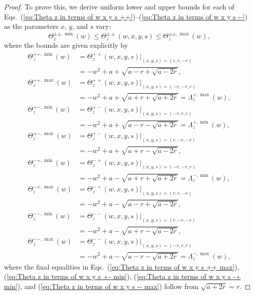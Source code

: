 \documentclass[12pt]{iopart}
\begin{document}
\begin{proof}
To prove this, we derive uniform lower and upper bounds for each of Eqs.~(\ref{eq:Theta z in terms of w x y s ++})–(\ref{eq:Theta z in terms of w x y s --}) as the parameters \( x \), \( y \), and \( s \) vary:  
\begin{equation}\label{eq:Thetas pm uniform bounds}
\Theta^{\pm\pm,\min}_z(w) \leq \Theta^{\pm\pm}_z(w,x,y,s) \leq \Theta^{\pm\pm,\max}_z(w),
\end{equation} 
where the bounds are given explicitly by  
\begin{eqnarray}
\Theta^{++,\min}_z(w) &= \Theta^{++}_z(w,x,y,s)|_{(x,y,s)=(r,r,-r)} \nonumber \\
&= -w^2 + a + \sqrt{a-r + \sqrt{a-2r}}, \label{eq:Theta z in terms of w x y s ++ min} \\
\Theta^{++,\max}_z(w) &= \Theta^{++}_z(w,x,y,s)|_{(x,y,s)=(-r,-r,r)} \nonumber \\
&= -w^2 + a + \sqrt{a+r + \sqrt{a+2r}} = \Lambda^{+,\max}_z(w), \label{eq:Theta z in terms of w x y s ++ max} \\
\Theta^{+-,\min}_z(w) &= \Theta^{+-}_z(w,x,y,s)|_{(x,y,s)=(-r,r,r)} \nonumber \\
&= -w^2 + a + \sqrt{a-r - \sqrt{a+2r}} = \Lambda^{+,\min}_z(w), \label{eq:Theta z in terms of w x y s +- min} \\
\Theta^{+-,\max}_z(w) &= \Theta^{+-}_z(w,x,y,s)|_{(x,y,s)=(r,-r,-r)} \nonumber \\
&= -w^2 + a + \sqrt{a+r - \sqrt{a-2r}}, \label{eq:Theta z in terms of w x y s +- max} \\
\Theta^{-+,\min}_z(w) &= \Theta^{-+}_z(w,x,y,s)|_{(x,y,s)=(-r,-r,r)} \nonumber \\
&= -w^2 + a - \sqrt{a+r + \sqrt{a+2r}} = \Lambda^{-,\min}_z(w), \label{eq:Theta z in terms of w x y s -+ min} \\
\Theta^{-+,\max}_z(w) &= \Theta^{-+}_z(w,x,y,s)|_{(x,y,s)=(r,r,-r)} \nonumber \\
&= -w^2 + a - \sqrt{a-r + \sqrt{a-2r}}, \label{eq:Theta z in terms of w x y s -+ max} \\
\Theta^{--,\min}_z(w) &= \Theta^{--}_z(w,x,y,s)|_{(x,y,s)=(r,-r,-r)} \nonumber \\
&= -w^2 + a - \sqrt{a+r - \sqrt{a-2r}}, \label{eq:Theta z in terms of w x y s -- min} \\
\Theta^{--,\max}_z(w) &= \Theta^{--}_z(w,x,y,s)|_{(x,y,s)=(-r,r,r)} \nonumber \\
&= -w^2 + a - \sqrt{a-r - \sqrt{a+2r}} = \Lambda^{-,\max}_z(w), \label{eq:Theta z in terms of w x y s -- max}
\end{eqnarray}
where the final equalities in Eqs.~(\ref{eq:Theta z in terms of w x y s ++ max}), (\ref{eq:Theta z in terms of w x y s +- min}), (\ref{eq:Theta z in terms of w x y s -+ min}), and (\ref{eq:Theta z in terms of w x y s -- max}) follow from \( \sqrt{a+2r} = r \).  


\end{proof}
\end{document}

